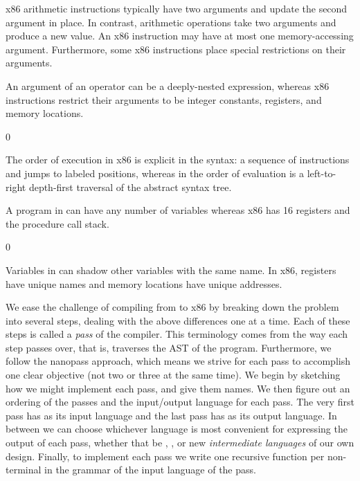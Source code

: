 \documentclass[7x10,nocrop]{TimesAPriori_MIT}%
\def\racketEd{0}
\def\edition{1}
\begin{document}
\begin{enumerate}
\item x86 arithmetic instructions typically have two arguments and
  update the second argument in place. In contrast, \LangVar{}
  arithmetic operations take two arguments and produce a new value.
  An x86 instruction may have at most one memory-accessing argument.
  Furthermore, some x86 instructions place special restrictions on
  their arguments.

\item An argument of an \LangVar{} operator can be a deeply-nested
  expression, whereas x86 instructions restrict their arguments to be
  integer constants, registers, and memory locations.

{\if\edition\racketEd      
\item The order of execution in x86 is explicit in the syntax: a
  sequence of instructions and jumps to labeled positions, whereas in
  \LangVar{} the order of evaluation is a left-to-right depth-first
  traversal of the abstract syntax tree.
\fi}

\item A program in \LangVar{} can have any number of variables
  whereas x86 has 16 registers and the procedure call stack.
{\if\edition\racketEd    
\item Variables in \LangVar{} can shadow other variables with the
  same name. In x86, registers have unique names and memory locations
  have unique addresses.
\fi}  
\end{enumerate}

We ease the challenge of compiling from \LangVar{} to x86 by breaking
down the problem into several steps, dealing with the above
differences one at a time. Each of these steps is called a \emph{pass}
of the compiler.
%
This terminology comes from the way each step passes over, that is,
traverses the AST of the program.
%
Furthermore, we follow the nanopass approach, which means we strive
for each pass to accomplish one clear objective (not two or three at
the same time).
%
We begin by sketching how we might implement each pass, and give them
names.  We then figure out an ordering of the passes and the
input/output language for each pass. The very first pass has
\LangVar{} as its input language and the last pass has \LangXInt{} as
its output language. In between we can choose whichever language is
most convenient for expressing the output of each pass, whether that
be \LangVar{}, \LangXInt{}, or new \emph{intermediate languages} of
our own design.  Finally, to implement each pass we write one
recursive function per non-terminal in the grammar of the input
language of the pass.  
\end{document}
